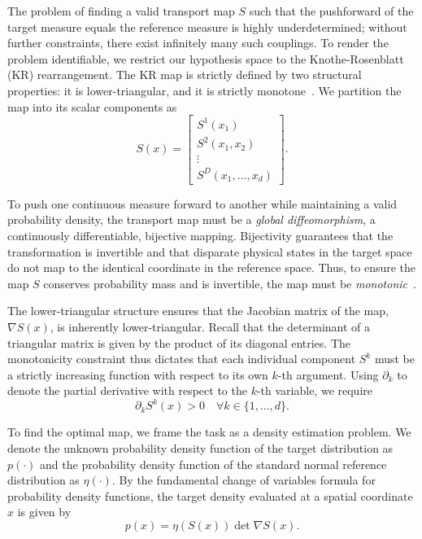 The problem of finding a valid transport map $S$ such that the pushforward of the target measure equals the reference measure is highly underdetermined; without further constraints, there exist infinitely many such couplings. To render the problem identifiable, we restrict our hypothesis space to the Knothe-Rosenblatt (KR) rearrangement. The KR map is strictly defined by two structural properties: it is lower-triangular, and it is strictly monotone~\cite{Baptista2022}. We partition the map into its scalar components as
\begin{equation*}
    S(x) = \begin{bmatrix} S^1(x_1) \\ S^2(x_1, x_2) \\ \vdots \\ S^D(x_1, \dots, x_d) \end{bmatrix}.
    \label{eq:kr_map_structure}
\end{equation*}

To push one continuous measure forward to another while maintaining a valid probability density, the transport map must be a \emph{global diffeomorphism}, a continuously differentiable, bijective mapping. Bijectivity guarantees that the transformation is invertible and that disparate physical states in the target space do not map to the identical coordinate in the reference space. Thus, to ensure the map $S$ conserves probability mass and is invertible, the map must be \emph{monotonic}~\cite{Baptista2022}. 

The lower-triangular structure ensures that the Jacobian matrix of the map, $\nabla S(x)$, is inherently lower-triangular. Recall that the determinant of a triangular matrix is given by the product of its diagonal entries. The monotonicity constraint thus dictates that each individual component $S^k$ must be a strictly increasing function with respect to its own $k$-th argument. Using $\partial_k$ to denote the partial derivative with respect to the $k$-th variable, we require
\begin{equation}
    \boxed{
    \partial_k S^k(x) > 0 \quad \forall k \in \{1, \dots, d\}}.
    \label{eq:monotonicity_continuous}
\end{equation}

To find the optimal map, we frame the task as a density estimation problem. We denote the unknown probability density function of the target distribution as $p(\cdot)$ and the probability density function of the standard normal reference distribution as $\eta(\cdot)$. By the fundamental change of variables formula for probability density functions, the target density evaluated at a spatial coordinate $x$ is given by
\begin{equation*}
    p(x) = \eta(S(x)) \det \nabla S(x).
    \label{eq:change_of_variables}
\end{equation*}

